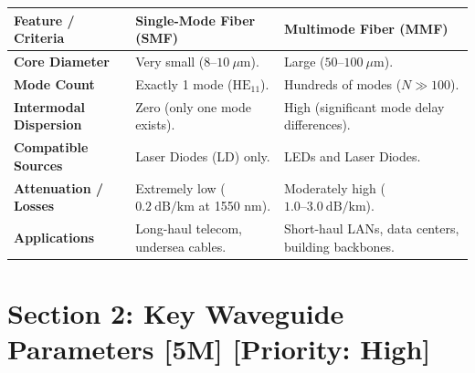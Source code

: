 \begin{table}[H]
\centering
\begin{tabular}{|p{}|p{}|p{}|}
\hline
Feature / Criteria & Single-Mode Fiber (SMF) & Multimode Fiber (MMF) \\
\hline
\textbf{Core Diameter} & Very small ($8\text{--}10\ \mu\text{m}$). & Large ($50\text{--}100\ \mu\text{m}$). \\
\hline
\textbf{Mode Count} & Exactly 1 mode ($\text{HE}_{11}$). & Hundreds of modes ($N \gg 100$). \\
\hline
\textbf{Intermodal Dispersion} & Zero (only one mode exists). & High (significant mode delay differences). \\
\hline
\textbf{Compatible Sources} & Laser Diodes (LD) only. & LEDs and Laser Diodes. \\
\hline
\textbf{Attenuation / Losses} & Extremely low ($0.2\ \text{dB/km}$ at 1550 nm). & Moderately high ($1.0\text{--}3.0\ \text{dB/km}$). \\
\hline
\textbf{Applications} & Long-haul telecom, undersea cables. & Short-haul LANs, data centers, building backbones. \\
\hline
\end{tabular}
\end{table}


\section{Section 2: Key Waveguide Parameters [5M] [Priority: High]}

